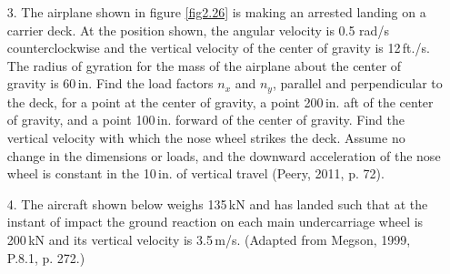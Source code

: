 \documentclass{AeroStructure-ERJohnson}
\begin{document}
\begin{enumerate}
\item[3.] The airplane shown in figure \ref{fig2.26} is making an arrested landing on a carrier deck. At the position shown, the angular velocity is 0.5 rad/s counterclockwise and the vertical velocity of the center of gravity is 12\,ft./s. The radius of gyration for the mass of the airplane about the center of gravity is 60\,in. Find the load factors $n_{x}$ and $n_{y}$, parallel and perpendicular to the deck, for a point at the center of gravity, a point 200\,in. aft of the center of gravity, and a point 100\,in. forward of the center of gravity. Find the vertical velocity with which the nose wheel strikes the deck. Assume no change in the dimensions or loads, and the downward acceleration of the nose wheel is constant in the 10\,in. of vertical travel (Peery, 2011, p. 72).


{\def\thefigure{2.26}
}

\vspace*{-10pt}

\item[4.] The aircraft shown below weighs 135\,kN and has landed such that at the instant of impact the ground reaction on each main undercarriage wheel is 200\,kN and its vertical velocity is 3.5\,m/s.  (Adapted from Megson, 1999, P.8.1, p. 272.)

{\def\thefigure{2.27}
}

\medskip


\end{enumerate}
\end{document}
